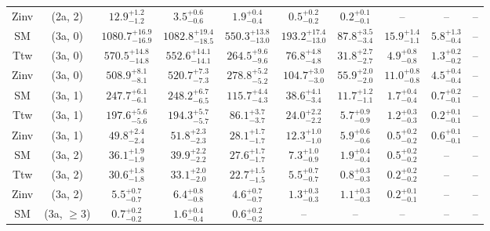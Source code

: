 \begin{table}[h!]
{\begin{tabular}{cccccccccc}
	Zinv & (2a, 2) & $12.9^{+ 1.2 }_{- 1.2 }$ & $3.5^{+ 0.6 }_{- 0.6 }$ & $1.9^{+ 0.4 }_{- 0.4 }$ & $0.5^{+ 0.2 }_{- 0.2 }$ & $0.2^{+ 0.1 }_{- 0.1 }$ & -- & -- & -- \\[0.5ex] 
	SM & (3a, 0) & $1080.7^{+ 16.9 }_{- 16.9 }$ & $1082.8^{+ 19.4 }_{- 18.5 }$ & $550.3^{+ 13.8 }_{- 13.0 }$ & $193.2^{+ 17.4 }_{- 13.0 }$ & $87.8^{+ 3.5 }_{- 3.4 }$ & $15.9^{+ 1.4 }_{- 1.1 }$ & $5.8^{+ 1.3 }_{- 0.4 }$ & -- \\[0.5ex] 
	Ttw & (3a, 0) & $570.5^{+ 14.8 }_{- 14.8 }$ & $552.6^{+ 14.1 }_{- 14.1 }$ & $264.5^{+ 9.6 }_{- 9.6 }$ & $76.8^{+ 4.8 }_{- 4.8 }$ & $31.8^{+ 2.7 }_{- 2.7 }$ & $4.9^{+ 0.8 }_{- 0.8 }$ & $1.3^{+ 0.2 }_{- 0.2 }$ & -- \\[0.5ex] 
	Zinv & (3a, 0) & $508.9^{+ 8.1 }_{- 8.1 }$ & $520.7^{+ 7.3 }_{- 7.3 }$ & $278.8^{+ 5.2 }_{- 5.2 }$ & $104.7^{+ 3.0 }_{- 3.0 }$ & $55.9^{+ 2.0 }_{- 2.0 }$ & $11.0^{+ 0.8 }_{- 0.8 }$ & $4.5^{+ 0.4 }_{- 0.4 }$ & -- \\[0.5ex] 
	SM & (3a, 1) & $247.7^{+ 6.1 }_{- 6.1 }$ & $248.2^{+ 6.7 }_{- 6.5 }$ & $115.7^{+ 4.4 }_{- 4.3 }$ & $38.6^{+ 4.1 }_{- 3.4 }$ & $11.7^{+ 1.2 }_{- 1.1 }$ & $1.7^{+ 0.4 }_{- 0.4 }$ & $0.7^{+ 0.2 }_{- 0.1 }$ & -- \\[0.5ex] 
	Ttw & (3a, 1) & $197.6^{+ 5.6 }_{- 5.6 }$ & $194.3^{+ 5.7 }_{- 5.7 }$ & $86.1^{+ 3.7 }_{- 3.7 }$ & $24.0^{+ 2.2 }_{- 2.2 }$ & $5.7^{+ 0.9 }_{- 0.9 }$ & $1.2^{+ 0.3 }_{- 0.3 }$ & $0.2^{+ 0.1 }_{- 0.1 }$ & -- \\[0.5ex] 
	Zinv & (3a, 1) & $49.8^{+ 2.4 }_{- 2.4 }$ & $51.8^{+ 2.3 }_{- 2.3 }$ & $28.1^{+ 1.7 }_{- 1.7 }$ & $12.3^{+ 1.0 }_{- 1.0 }$ & $5.9^{+ 0.6 }_{- 0.6 }$ & $0.5^{+ 0.2 }_{- 0.2 }$ & $0.6^{+ 0.1 }_{- 0.1 }$ & -- \\[0.5ex] 
	SM & (3a, 2) & $36.1^{+ 1.9 }_{- 1.9 }$ & $39.9^{+ 2.2 }_{- 2.2 }$ & $27.6^{+ 1.7 }_{- 1.7 }$ & $7.3^{+ 1.0 }_{- 0.9 }$ & $1.9^{+ 0.4 }_{- 0.4 }$ & $0.5^{+ 0.2 }_{- 0.2 }$ & -- & -- \\[0.5ex] 
	Ttw & (3a, 2) & $30.6^{+ 1.8 }_{- 1.8 }$ & $33.1^{+ 2.0 }_{- 2.0 }$ & $22.7^{+ 1.5 }_{- 1.5 }$ & $5.5^{+ 0.7 }_{- 0.7 }$ & $0.8^{+ 0.3 }_{- 0.3 }$ & $0.2^{+ 0.2 }_{- 0.2 }$ & -- & -- \\[0.5ex] 
	Zinv & (3a, 2) & $5.5^{+ 0.7 }_{- 0.7 }$ & $6.4^{+ 0.8 }_{- 0.8 }$ & $4.6^{+ 0.7 }_{- 0.7 }$ & $1.3^{+ 0.3 }_{- 0.3 }$ & $1.1^{+ 0.3 }_{- 0.3 }$ & $0.2^{+ 0.1 }_{- 0.1 }$ & -- & -- \\[0.5ex] 
	SM & (3a, $\ge3$) & $0.7^{+ 0.2 }_{- 0.2 }$ & $1.6^{+ 0.4 }_{- 0.4 }$ & $0.6^{+ 0.2 }_{- 0.2 }$ & -- & -- & -- & -- & -- \\[0.5ex] 

\end{tabular}}
\end{table}
